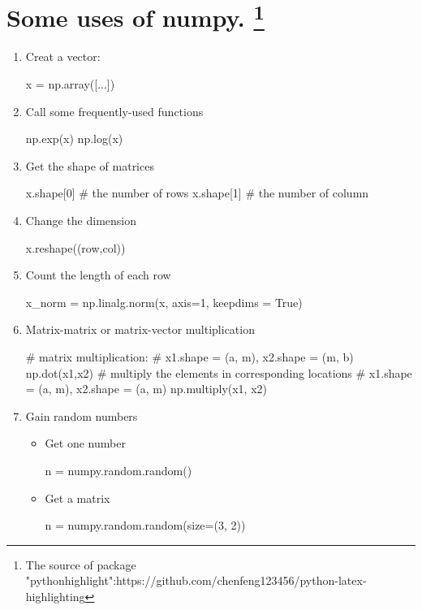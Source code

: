 \documentclass[10pt]{article}
\begin{document}
\section{Some uses of numpy. \protect\footnote{\tiny The source of package "pythonhighlight":https://github.com/chenfeng123456/python-latex-highlighting}}
\begin{enumerate}
\item Creat a vector:
\begin{python}
x = np.array([...])
\end{python}

\item Call some frequently-used functions
\begin{python}
np.exp(x)
np.log(x)
\end{python}

\item Get the shape of matrices
\begin{python}[language=Python]
x.shape[0] # the number of rows
x.shape[1] # the number of column
\end{python}

\item Change the dimension
\begin{python}
x.reshape((row,col))
\end{python}

\item Count the length of each row
\begin{python}
x_norm = np.linalg.norm(x, axis=1, keepdims = True)
\end{python}

\item Matrix-matrix or matrix-vector multiplication
\begin{python}
# matrix multiplication: 
# x1.shape = (a, m), x2.shape = (m, b)
np.dot(x1,x2) 
# multiply the elements in corresponding locations
# x1.shape = (a, m), x2.shape = (a, m)
np.multiply(x1, x2) 
\end{python}

\item Gain random numbers

\begin{itemize}

\item Get one number
\begin{python}
n = numpy.random.random()
\end{python}

\item Get a matrix
\begin{python}
n = numpy.random.random(size=(3, 2))
\end{python}


\end{itemize}
\end{enumerate}
\end{document}
